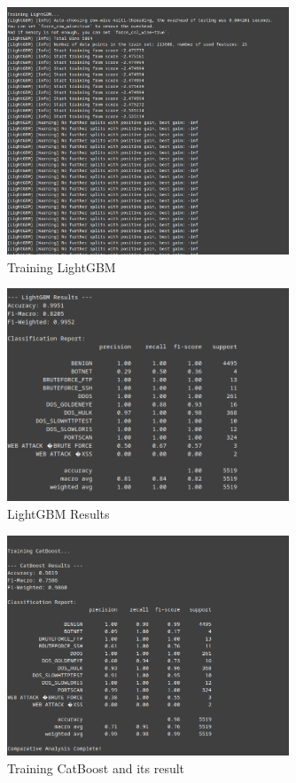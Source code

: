  \begin{figure}[H]
     \centering
     \includegraphics[width=0.75\textwidth]{assets/figures/outputs/6.png}
	\caption{Training LightGBM}
 \end{figure}
 
 \begin{figure}[H]
     \centering
     \includegraphics[width=0.75\textwidth]{assets/figures/outputs/7.png}
	\caption{LightGBM Results}
 \end{figure}
 
 \begin{figure}[H]
     \centering
     \includegraphics[width=0.75\textwidth]{assets/figures/outputs/8.png}
     \caption{Training CatBoost and its result}
 \end{figure}
 

